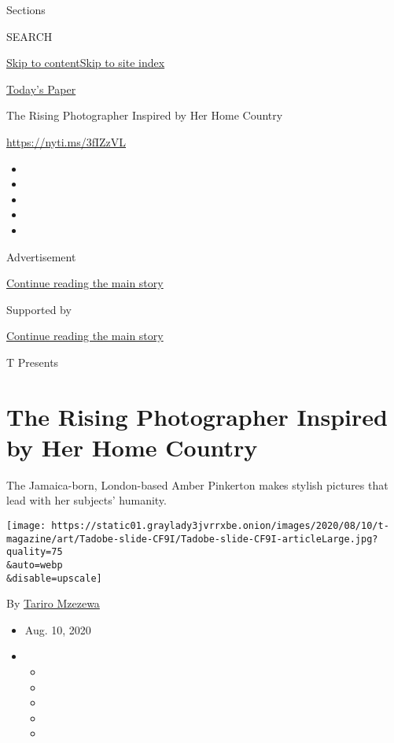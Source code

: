 Sections

SEARCH

\protect\hyperlink{site-content}{Skip to
content}\protect\hyperlink{site-index}{Skip to site index}

\href{https://myaccount.nytimes3xbfgragh.onion/auth/login?response_type=cookie\&client_id=vi}{}

\href{https://www.nytimes3xbfgragh.onion/section/todayspaper}{Today's
Paper}

The Rising Photographer Inspired by Her Home Country

\url{https://nyti.ms/3fIZzVL}

\begin{itemize}
\item
\item
\item
\item
\item
\end{itemize}

Advertisement

\protect\hyperlink{after-top}{Continue reading the main story}

Supported by

\protect\hyperlink{after-sponsor}{Continue reading the main story}

T Presents

\hypertarget{the-rising-photographer-inspired-by-her-home-country}{%
\section{The Rising Photographer Inspired by Her Home
Country}\label{the-rising-photographer-inspired-by-her-home-country}}

The Jamaica-born, London-based Amber Pinkerton makes stylish pictures
that lead with her subjects' humanity.

\texttt{[image: https://static01.graylady3jvrrxbe.onion/images/2020/08/10/t-magazine/art/Tadobe-slide-CF9I/Tadobe-slide-CF9I-articleLarge.jpg?quality=75\\\&auto=webp\\\&disable=upscale]}

By \href{https://www.nytimes3xbfgragh.onion/by/tariro-mzezewa}{Tariro
Mzezewa}

\begin{itemize}
\item
  Aug. 10, 2020
\item
  \begin{itemize}
  \item
  \item
  \item
  \item
  \item
  \end{itemize}
\end{itemize}

